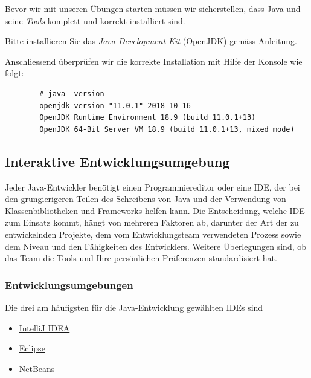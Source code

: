 \mode*

\begin{Exercise}[%
title={Installation der Software},
label={ex:installation}]

    Bevor wir mit unseren Übungen starten müssen wir sicherstellen, dass Java und
    seine {\em Tools} komplett und korrekt installiert sind.

    Bitte installieren Sie das {\em Java Development Kit} (OpenJDK) gemäss
    \href{https://jdk.java.net/11/}{Anleitung}.

    Anschliessend überprüfen wir die korrekte Installation mit Hilfe der Konsole wie folgt:

    \begin{verbatim}
        # java -version
        openjdk version "11.0.1" 2018-10-16
        OpenJDK Runtime Environment 18.9 (build 11.0.1+13)
        OpenJDK 64-Bit Server VM 18.9 (build 11.0.1+13, mixed mode)
    \end{verbatim}

\end{Exercise}

\subsection{Interaktive Entwicklungsumgebung}
\label{subsec:ide}

Jeder Java-Entwickler benötigt einen Programmiereditor oder eine IDE, der bei den
grungierigeren Teilen des Schreibens von Java und der Verwendung von Klassenbibliotheken
und Frameworks helfen kann. Die Entscheidung, welche IDE zum Einsatz kommt, hängt von
mehreren Faktoren ab, darunter der Art der zu entwickelnden Projekte, dem vom
Entwicklungsteam verwendeten Prozess sowie dem Niveau und den Fähigkeiten des
Entwicklers. Weitere Überlegungen sind, ob das Team die Tools und Ihre persönlichen
Präferenzen standardisiert hat.


\begin{frame}[fragile]
    \frametitle<presentation>{Entwicklungsumgebungen}

    Die drei am häufigsten für die Java-Entwicklung gewählten IDEs sind

    \begin{itemize}
        \item \href{https://www.jetbrains.com/idea}{IntelliJ IDEA}
        \item \href{https://www.eclipse.org/}{Eclipse}
        \item \href{https://netbeans.org/}{NetBeans}
    \end{itemize}

\end{frame}


